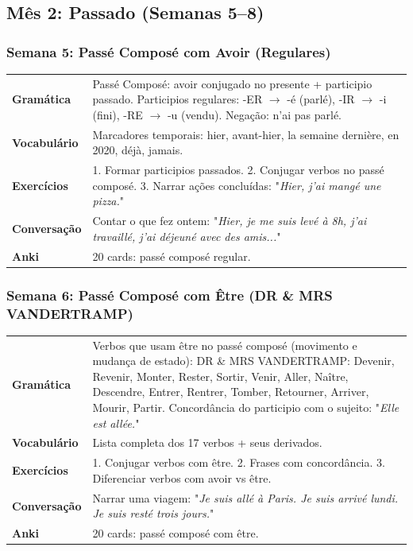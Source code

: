 \documentclass[a4paper,12pt]{article}
\begin{document}
\subsection{Mês 2: Passado (Semanas 5–8)}
\subsubsection*{Semana 5: Passé Composé com Avoir (Regulares)}
\begin{tabularx}{\linewidth}{>{\bfseries}l L}
    Gramática & Passé Composé: avoir conjugado no presente + participio passado. Participios regulares: -ER $\to$ -é (parlé), -IR $\to$ -i (fini), -RE $\to$ -u (vendu). Negação: n'ai pas parlé. \\
    Vocabulário & Marcadores temporais: hier, avant-hier, la semaine dernière, en 2020, déjà, jamais. \\
    Exercícios & 1. Formar participios passados. 2. Conjugar verbos no passé composé. 3. Narrar ações concluídas: "\emph{Hier, j'ai mangé une pizza.}" \\
    Conversação & Contar o que fez ontem: "\emph{Hier, je me suis levé à 8h, j'ai travaillé, j'ai déjeuné avec des amis...}" \\
    Anki & 20 cards: passé composé regular. \\
\end{tabularx}

\subsubsection*{Semana 6: Passé Composé com Être (DR \& MRS VANDERTRAMP)}
\begin{tabularx}{\linewidth}{>{\bfseries}l L}
    Gramática & Verbos que usam être no passé composé (movimento e mudança de estado): DR \& MRS VANDERTRAMP: Devenir, Revenir, Monter, Rester, Sortir, Venir, Aller, Naître, Descendre, Entrer, Rentrer, Tomber, Retourner, Arriver, Mourir, Partir. Concordância do participio com o sujeito: "\emph{Elle est allée.}" \\
    Vocabulário & Lista completa dos 17 verbos + seus derivados. \\
    Exercícios & 1. Conjugar verbos com être. 2. Frases com concordância. 3. Diferenciar verbos com avoir vs être. \\
    Conversação & Narrar uma viagem: "\emph{Je suis allé à Paris. Je suis arrivé lundi. Je suis resté trois jours.}" \\
    Anki & 20 cards: passé composé com être. \\
\end{tabularx}
\end{document}
